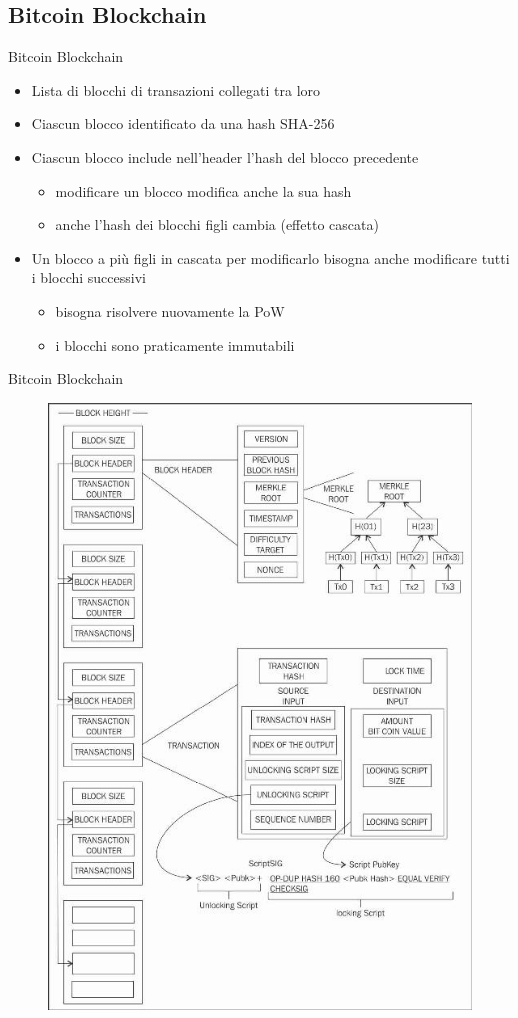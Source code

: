\documentclass{beamer}
\begin{document}
  \subsection{Bitcoin Blockchain}
  \begin{frame}{Bitcoin Blockchain}
     \begin{itemize}
         \item Lista di blocchi di transazioni collegati tra loro
         \item Ciascun blocco identificato da una hash SHA-256
         \item Ciascun blocco include nell'header l'hash del blocco precedente
         \begin{itemize}
             \item modificare un blocco modifica anche la sua hash
             \item anche l'hash dei blocchi figli cambia (effetto cascata)
         \end{itemize}
         \item Un blocco a più figli in cascata \MVRightarrow per modificarlo bisogna anche modificare tutti i blocchi successivi
         \begin{itemize}
             \item[\MVRightarrow] bisogna risolvere nuovamente la PoW 
             \item[\MVRightarrow] i blocchi sono praticamente immutabili 
         \end{itemize}
     \end{itemize}
  \end{frame}
  
  
  
  \begin{frame}{Bitcoin Blockchain}
    \begin{figure}[!htb]
    \centering
    \includegraphics[width=0.45\linewidth]{../img/bitcoin-blockchain-scheme.png}
    \end{figure}
  \end{frame}
  
\end{document}
